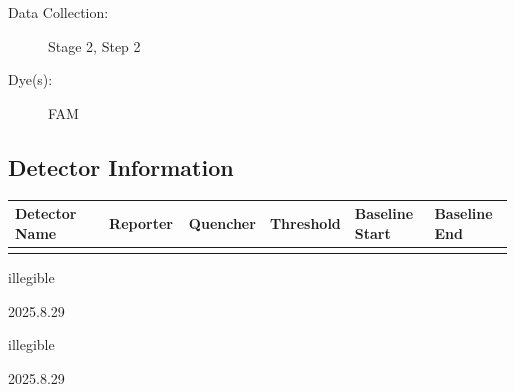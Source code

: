 \documentclass[UTF8,10pt,a4paper,fontset=fandol]{ctexart}
\newcommand{\fieldvalue}[1]{#1}
\newcommand{\handwritten}[1]{#1}
\begin{document}
\begin{description}
\item[Data Collection:] %
\fieldvalue{Stage 2, Step 2}
\item[Dye(s):] %
\fieldvalue{FAM}
\end{description}

\subsection{Detector Information}

\begin{center}
\small
\begin{tabular}{|p{0.19\linewidth}|p{0.16\linewidth}|p{0.16\linewidth}|p{0.16\linewidth}|p{0.16\linewidth}|p{0.16\linewidth}|}
\hline
\textbf{Detector Name} & \textbf{Reporter} & \textbf{Quencher} & \textbf{Threshold} & \textbf{Baseline Start} & \textbf{Baseline End} \\
\hline
\multicolumn{6}{c}{}
\\[-1.5ex]
\hline
\end{tabular}
\end{center}

\handwritten{illegible}

\handwritten{2025.8.29}

\handwritten{illegible}

\handwritten{2025.8.29}

\newpage
\end{document}
